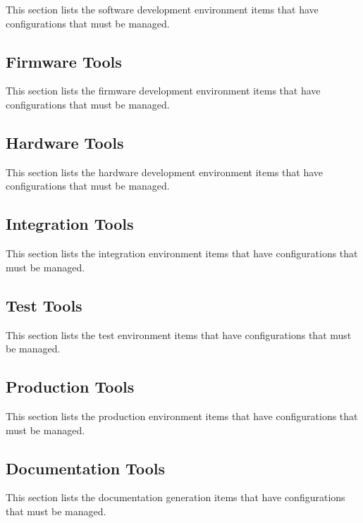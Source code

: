 This section lists the software development environment items that have configurations that must be managed.

\subsection{Firmware Tools}
\label{loc:CI_Dev_Firmware}

This section lists the firmware development environment items that have configurations that must be managed.

\subsection{Hardware Tools}
\label{loc:CI_Dev_Hardware}

This section lists the hardware development environment items that have configurations that must be managed.

\subsection{Integration Tools}
\label{loc:CI_Dev_Integration}

This section lists the integration environment items that have configurations that must be managed.

\subsection{Test Tools}
\label{loc:CI_Dev_Test}

This section lists the test environment items that have configurations that must be managed.

\subsection{Production Tools}
\label{loc:CI_Dev_Production}

This section lists the production environment items that have configurations that must be managed.

\subsection{Documentation Tools}
\label{loc:CI_Dev_Documentation}

This section lists the documentation generation items that have configurations that must be managed.


